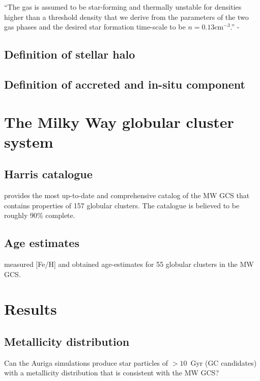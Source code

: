 \documentclass[a4paper,fleqn,usenatbib]{mnras}
\begin{document}
``The gas is assumed to be star-forming and thermally unstable for densities higher than a threshold density that we derive from the parameters of the two gas phases and the desired star formation time-scale to be $n = 0.13 \text{cm}^{−3}$.'' - \citep{2017MNRAS.467..179G}


\subsection{Definition of stellar halo}


\subsection{Definition of accreted and in-situ component}



\section{The Milky Way globular cluster system}
\label{sec:observations}

\subsection{Harris catalogue}
\label{sec:harris}
\citet[][2010 edition]{1996AJ....112.1487H} provides the most up-to-date and comprehensive catalog of the MW GCS that contains properties of 157 globular clusters. The catalogue is believed to be roughly 90\% complete.

\subsection{Age estimates}
\label{sec:vandenberg}
\citet{2013ApJ...775..134V} measured [Fe/H] and obtained age-estimates for 55 globular clusters in the MW GCS.


\section{Results}
\label{sec:results}
\subsection{Metallicity distribution}
\label{sec:metallicity}
Can the Auriga simulations produce star particles of $>10$~Gyr (GC candidates) with a metallicity distribution that is consistent with the MW GCS?
\end{document}

